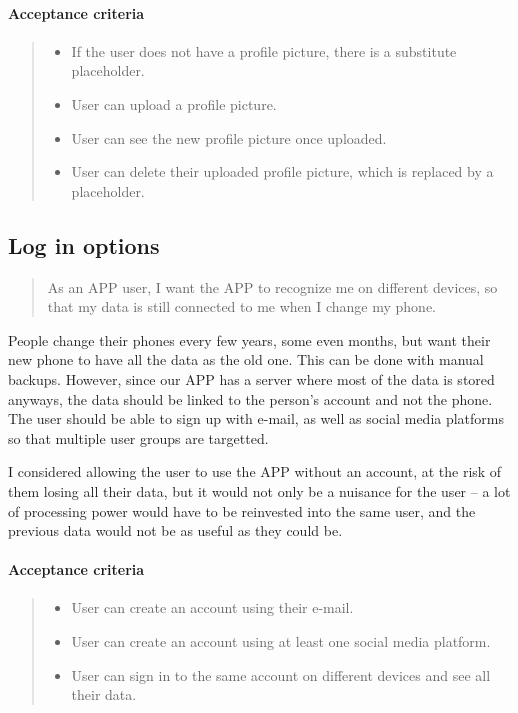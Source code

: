 \paragraph*{Acceptance criteria}
\begin{quote}
\begin{itemize}
    \item If the user does not have a profile picture, there is a substitute placeholder.
    \item User can upload a profile picture.
    \item User can see the new profile picture once uploaded.
    \item User can delete their uploaded profile picture, which is replaced by a placeholder.
\end{itemize}
\end{quote}

\subsection{Log in options}\label{US:user-log-in}
\begin{quote}
As an APP user, I want the APP to recognize me on different devices, so that my data is still connected to me when I change my phone.
\end{quote}

People change their phones every few years, some even months, but want their new phone to have all the data as the old one.
This can be done with manual backups.
However, since our APP has a server where most of the data is stored anyways, the data should be linked to the person's account and not the phone.
The user should be able to sign up with e-mail, as well as social media platforms so that multiple user groups are targetted.

I considered allowing the user to use the APP without an account, at the risk of them losing all their data, but it would not only be a nuisance for the user --
a lot of processing power would have to be reinvested into the same user, and the previous data would not be as useful as they could be.

\paragraph*{Acceptance criteria}
\begin{quote}
\begin{itemize}
    \item User can create an account using their e-mail.
    \item User can create an account using at least one social media platform.
    \item User can sign in to the same account on different devices and see all their data.
\end{itemize}
\end{quote}

